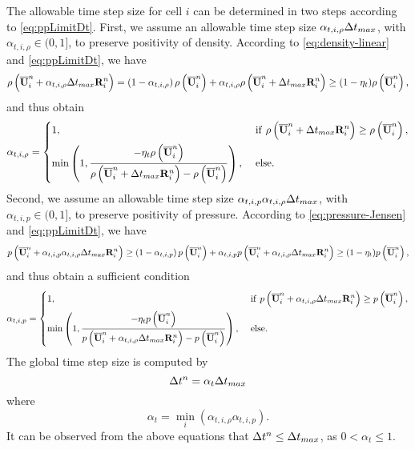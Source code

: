 The allowable time step size for cell $i$ can be determined in two steps according to \eqref{eq:ppLimitDt}. First, we assume an allowable time step size $\alpha_{t,i,\rho} \mathrm\Delta t_{max}$, with $\alpha_{t,i,\rho} \in (0,1]$, to preserve positivity of density. According to \eqref{eq:density-linear} and \eqref{eq:ppLimitDt}, we have
\begin{equation}
	\rho\left(\overline{\mathbf{U}}^n_i + \alpha_{t,i,\rho} \mathrm\Delta t_{max} \mathbf{R}^n_i\right)= \left(1- \alpha_{t,i,\rho}\right)\rho\left(\overline{\mathbf{U}}^n_i\right) + \alpha_{t,i,\rho} \rho\left(\overline{\mathbf{U}}^n_i + \mathrm\Delta t_{max} \mathbf{R}^n_i\right)  \geq
	(1- \eta_t)
	\rho\left(\overline{\mathbf{U}}_i^n\right),
\end{equation}
and thus obtain
\begin{equation}
	\alpha_{t,i,\rho} = \begin{dcases}
		 1, & \ \mathrm{if} \ \rho\left(\UM^n_i + \inc t_{max} \R^n_i\right) \geq  \rho\left(\UM^n_i\right), \\
		\min\left(1, \dfrac{-\eta_t \rho\left(\UM^n_i\right)}{\rho \left(\UM^n_i + \inc t_{max} \R^n_i\right)-  \rho\left(\UM^n_i\right)} \right), &\ 
		\mathrm{else}.
	\end{dcases}
\end{equation}
Second, we assume an allowable time step size $\alpha_{t,i,p}  \alpha_{t,i,\rho} \mathrm\Delta t_{max}$, with $\alpha_{t,i,p} \in (0,1]$, to preserve positivity of pressure. According to \eqref{eq:pressure-Jensen} and \eqref{eq:ppLimitDt}, we have
\begin{equation}
	p\left(\overline{\mathbf{U}}^n_i +  \alpha_{t,i,p} \alpha_{t,i,\rho} \mathrm\Delta t_{max} \mathbf{R}^n_i\right) \geq \left(1-\alpha_{t,i,p}\right)p\left(\overline{\mathbf{U}}^n_i\right) + \alpha_{t,i,p} p\left(\overline{\mathbf{U}}^n_i + \alpha_{t,i,\rho} \mathrm\Delta t_{max} \mathbf{R}^n_i\right) \geq
	(1- \eta_t)
	p\left(\overline{\mathbf{U}}_i^n\right),
\end{equation}
and thus obtain a sufficient condition
\begin{equation}
	\alpha_{t,i,p} = \begin{dcases}
		1, & \ \mathrm{if} \ p \left(\UM^n_i + \alpha_{t,i,\rho} \inc t_{max} \R^n_i\right) \geq  p \left(\UM^n_i\right), \\
		\min\left(1, \dfrac{-\eta_t p \left(\UM^n_i\right)}{p \left(\UM^n_i +  \alpha_{t,i,\rho} \inc t_{max} \R^n_i\right)-  p \left(\UM^n_i\right)} \right), &\ %
		\mathrm{else}.
	\end{dcases}
\end{equation}
The global time step size is computed by
\begin{equation}
    \mathrm\Delta t^n = \alpha_t \mathrm\Delta t_{max} 
\end{equation}
where
\begin{equation}
        \alpha_t = \min_i(\alpha_{t,i,\rho}\alpha_{t,i,p}).
\end{equation}
It can be observed from the above equations that $\mathrm\Delta t^n \leq \mathrm\Delta t_{max}$, as $0<\alpha_t \leq 1$.

